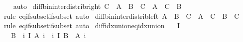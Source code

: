 \begin{isabellebody}
%
\isadelimproof
\ \ %
\endisadelimproof
%
\isatagproof
{}\isamarkupfalse%
\ auto%
\endisatagproof
{\isafoldproof}%
%
\isadelimproof
\isanewline
%
\endisadelimproof
\isanewline
{}\isamarkupfalse%
\ diff{\isacharunderscore}{\kern0pt}bin{\isacharunderscore}{\kern0pt}inter{\isacharunderscore}{\kern0pt}distrib{\isacharunderscore}{\kern0pt}right{\isacharcolon}{\kern0pt}\ {\isachardoublequoteopen}C\ {\isasyminter}\ {\isacharparenleft}{\kern0pt}A\ {\isasymsetminus}\ B{\isacharparenright}{\kern0pt}\ {\isacharequal}{\kern0pt}\ {\isacharparenleft}{\kern0pt}C\ {\isasyminter}\ A{\isacharparenright}{\kern0pt}\ {\isasymsetminus}\ {\isacharparenleft}{\kern0pt}C\ {\isasyminter}\ B{\isacharparenright}{\kern0pt}{\isachardoublequoteclose}\isanewline
%
\isadelimproof
\ \ %
\endisadelimproof
%
\isatagproof
{}\isamarkupfalse%
\ {\isacharparenleft}{\kern0pt}rule\ eq{\isacharunderscore}{\kern0pt}if{\isacharunderscore}{\kern0pt}subset{\isacharunderscore}{\kern0pt}if{\isacharunderscore}{\kern0pt}subset{\isacharparenright}{\kern0pt}\ auto%
\endisatagproof
{\isafoldproof}%
%
\isadelimproof
\isanewline
%
\endisadelimproof
\isanewline
{}\isamarkupfalse%
\ diff{\isacharunderscore}{\kern0pt}bin{\isacharunderscore}{\kern0pt}inter{\isacharunderscore}{\kern0pt}distrib{\isacharunderscore}{\kern0pt}left{\isacharcolon}{\kern0pt}\ {\isachardoublequoteopen}{\isacharparenleft}{\kern0pt}A\ {\isasymsetminus}\ B{\isacharparenright}{\kern0pt}\ {\isasyminter}\ C\ {\isacharequal}{\kern0pt}\ {\isacharparenleft}{\kern0pt}A\ {\isasyminter}\ C{\isacharparenright}{\kern0pt}\ {\isasymsetminus}\ {\isacharparenleft}{\kern0pt}B\ {\isasyminter}\ C{\isacharparenright}{\kern0pt}{\isachardoublequoteclose}\isanewline
%
\isadelimproof
\ \ %
\endisadelimproof
%
\isatagproof
{}\isamarkupfalse%
\ {\isacharparenleft}{\kern0pt}rule\ eq{\isacharunderscore}{\kern0pt}if{\isacharunderscore}{\kern0pt}subset{\isacharunderscore}{\kern0pt}if{\isacharunderscore}{\kern0pt}subset{\isacharparenright}{\kern0pt}\ auto%
\endisatagproof
{\isafoldproof}%
%
\isadelimproof
\isanewline
%
\endisadelimproof
\isanewline
{}\isamarkupfalse%
\ diff{\isacharunderscore}{\kern0pt}idx{\isacharunderscore}{\kern0pt}union{\isacharunderscore}{\kern0pt}eq{\isacharunderscore}{\kern0pt}idx{\isacharunderscore}{\kern0pt}union{\isacharcolon}{\kern0pt}\isanewline
\ \ \ {\isachardoublequoteopen}I\ {\isasymnoteq}\ {\isacharbraceleft}{\kern0pt}{\isacharbraceright}{\kern0pt}{\isachardoublequoteclose}\isanewline
\ \ \ {\isachardoublequoteopen}B\ {\isasymsetminus}\ {\isacharparenleft}{\kern0pt}{\isasymUnion}i{\isasymin}\ I{\isachardot}{\kern0pt}\ A\ i{\isacharparenright}{\kern0pt}\ {\isacharequal}{\kern0pt}\ {\isacharparenleft}{\kern0pt}{\isasymInter}i{\isasymin}\ I{\isachardot}{\kern0pt}\ B\ {\isasymsetminus}\ A\ i{\isacharparenright}{\kern0pt}{\isachardoublequoteclose}\isanewline

\end{isabellebody}
